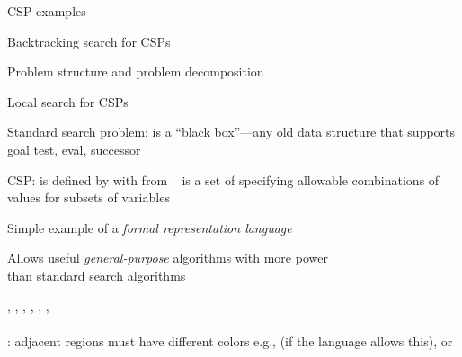 \documentclass{article}
\begin{document}
\begin{huge}

\sf


\blob CSP examples

\blob Backtracking search for CSPs

\blob Problem structure and problem decomposition

\blob Local search for CSPs





Standard search problem:\al
{} is a ``black box''---any old data structure\nl
that supports goal test, eval, successor

CSP:\al
{} is defined by  
   with  from  \al
\ \al
{} is a set of  specifying\nl
   allowable combinations of values for subsets of variables

Simple example of a \emph{formal representation language}

Allows useful \emph{general-purpose} algorithms with more power\\
than standard search algorithms



\vspace*{-0.0in}

\textwidth
{}

\vspace*{-0.6in}

 , , , , , ,  \\
 \\
: adjacent regions must have different colors\al
e.g.,  (if the language allows this), or\al
{}



\end{huge}
\end{document}
